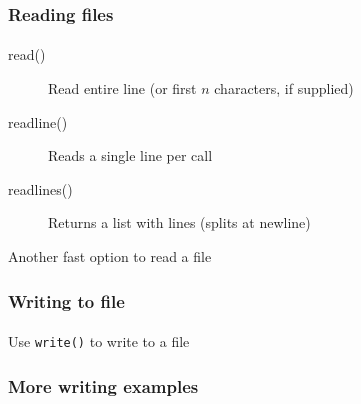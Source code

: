 \begin{frame}\frametitle{Reading files}
    \framesubtitle{}

    \begin{description}
        \item[read()] Read entire line (or first $n$ characters, if supplied)
        \item[readline()] Reads a single line per call
        \item[readlines()] Returns a list with lines (splits at newline)
    \end{description}

    \pause

    Another fast option to read a file

\end{frame}

\begin{frame}\frametitle{Writing to file}
    \framesubtitle{}

    Use \texttt{write()} to write to a file


\end{frame}

\begin{frame}\frametitle{More writing examples}
    \framesubtitle{}


\end{frame}

